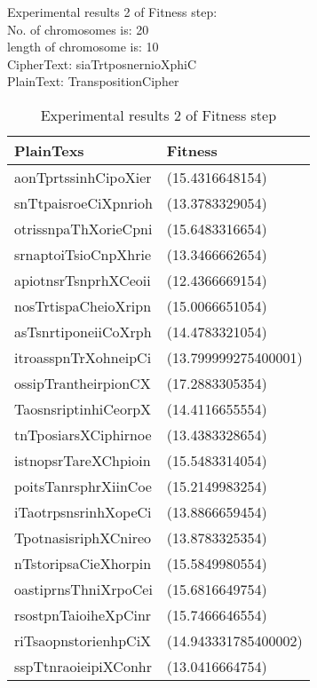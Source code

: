 \textsf{Experimental results 2 of Fitness step:}\\
    \colorbox{blue!30}{\textsf{     No. of chromosomes is: 20}}\\
    \colorbox{blue!30}{\textsf{     length of chromosome is: 10}}\\
    \colorbox{blue!30}{\textsf{     CipherText: siaTrtposnernioXphiC}}\\
    \colorbox{blue!30}{\textsf{     PlainText: TranspositionCipher}}

\begin{table}[h!]
\centering
\begin{tabular}{l l}
    \hline
    \cellcolor[gray]{0.9} PlainTexs& \cellcolor[gray]{0.9} Fitness\\ \hline
    aonTprtssinhCipoXier&(15.4316648154)\\ \hline  
snTtpaisroeCiXpnrioh&(13.3783329054)\\ \hline  
otrissnpaThXorieCpni&(15.6483316654)\\ \hline  
srnaptoiTsioCnpXhrie&(13.3466662654)\\ \hline  
apiotnsrTsnprhXCeoii&(12.4366669154)\\ \hline  
nosTrtispaCheioXripn&(15.0066651054)\\ \hline  
asTsnrtiponeiiCoXrph&(14.4783321054)\\ \hline  
itroasspnTrXohneipCi&(13.799999275400001)\\ \hline  
ossipTrantheirpionCX&(17.2883305354)\\ \hline  
TaosnsriptinhiCeorpX&(14.4116655554)\\ \hline  
tnTposiarsXCiphirnoe&(13.4383328654)\\ \hline  
istnopsrTareXChpioin&(15.5483314054)\\ \hline  
poitsTanrsphrXiinCoe&(15.2149983254)\\ \hline  
iTaotrpsnsrinhXopeCi&(13.8866659454)\\ \hline  
TpotnasisriphXCnireo&(13.8783325354)\\ \hline  
nTstoripsaCieXhorpin&(15.5849980554)\\ \hline  
oastiprnsThniXrpoCei&(15.6816649754)\\ \hline  
rsostpnTaioiheXpCinr&(15.7466646554)\\ \hline  
riTsaopnstorienhpCiX&(14.943331785400002)\\ \hline  
sspTtnraoieipiXConhr&(13.0416664754)\\ \hline  
\end{tabular}
\caption{Experimental results 2 of Fitness step}

\end{table}


